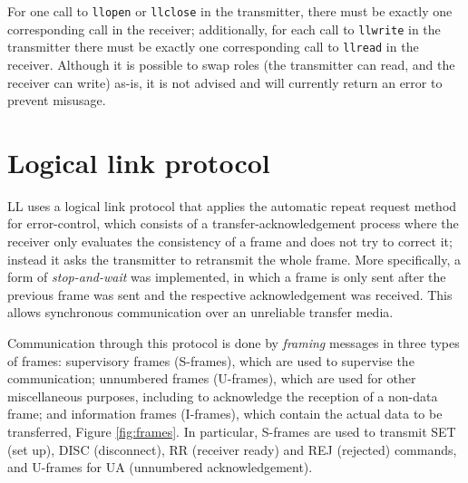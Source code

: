 \documentclass[a4paper, 11pt]{report}
\begin{document}
For one call to \texttt{llopen} or \texttt{llclose} in the transmitter, there must be exactly one corresponding call in the receiver; additionally, for each call to \texttt{llwrite} in the transmitter there must be exactly one corresponding call to \texttt{llread} in the receiver. Although it is possible to swap roles (the transmitter can read, and the receiver can write) as-is, it is not advised and will currently return an error to prevent misusage.

\section{Logical link protocol} \label{sec:LLProtocol}

LL uses a logical link protocol that applies the automatic repeat request method for error-control, which consists of a transfer-acknowledgement process where the receiver only evaluates the consistency of a frame and does not try to correct it; instead it asks the transmitter to retransmit the whole frame. More specifically, a form of \textit{stop-and-wait} was implemented, in which a frame is only sent after the previous frame was sent and the respective acknowledgement was received. This allows synchronous communication over an unreliable transfer media.

Communication through this protocol is done by \textit{framing} messages in three types of frames: supervisory frames (S-frames), which are used to supervise the communication; unnumbered frames (U-frames), which are used for other miscellaneous purposes, including to acknowledge the reception of a non-data frame; and information frames (I-frames), which contain the actual data to be transferred, Figure \ref{fig:frames}. In particular, S-frames are used to transmit SET (set up), DISC (disconnect), RR (receiver ready) and REJ (rejected) commands, and U-frames for UA (unnumbered acknowledgement).
\end{document}
